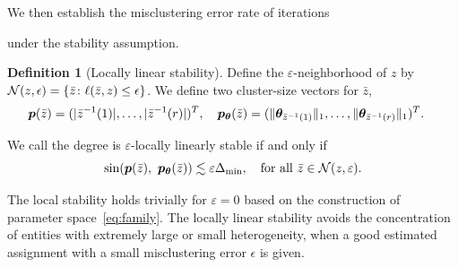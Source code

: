\documentclass[lettersize,onecolumn,journal]{IEEEtran}
\theoremstyle{definition}
\theoremstyle{definition}
\newtheorem{defn}{Definition}
\begin{document}
We then establish the misclustering error rate of iterations 
{ \color{blue} under the stability assumption.

\begin{defn}[Locally linear stability] 
Define the $\varepsilon$-neighborhood of $z$ by $\mathcal{N}(z,\epsilon)=\{\bar z\colon \ell(\bar z, z)\leq \epsilon\}$. We define two cluster-size vectors for $\bar z$,
\begin{align}
    &\bm{p}(\bar z)=(|\bar z^{-1}(1)|, \ldots,|\bar z^{-1}(r)|)^T, \quad \bm{p}_{\boldsymbol{\theta}}(\bar z)=(\lVert\boldsymbol{\theta}_{\bar z^{-1}(1)}\rVert_1,\ldots,\lVert\boldsymbol{\theta}_{\bar z^{-1}(r)}\rVert_1)^T.
\end{align}

We call the degree is $\varepsilon$-locally linearly stable if and only if 
\begin{equation}
    \sin(\bm{p}(\bar z),\ \bm{p}_{\boldsymbol{\theta}}(\bar z))\lesssim \varepsilon \Delta_{\min} ,\quad \text{for all } \bar z\in \mathcal{N}(z, \varepsilon).
\end{equation}
\end{defn}
}

The local stability holds trivially for $\varepsilon=0$ based on the construction of parameter space~\eqref{eq:family}. {\color{blue} The locally linear stability avoids the concentration of entities with extremely large or small heterogeneity, when a good estimated assignment with a small misclustering error $\epsilon$ is given.   }
 
\end{document}

